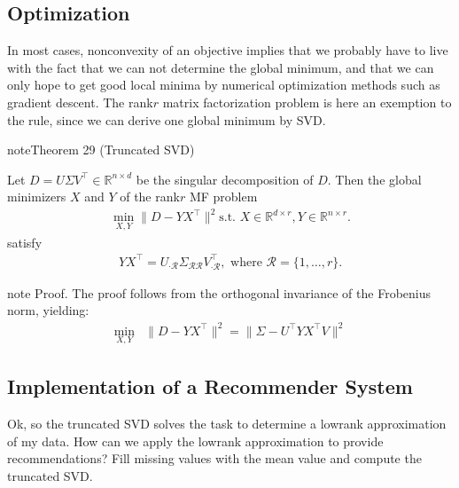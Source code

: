 \documentclass[letterpaper,10pt,english]{jupyterBook}
\begin{document}
\subsection{Optimization}
\label{\detokenize{dim_reduction_mf:optimization}}
\sphinxAtStartPar
In most cases, nonconvexity of an objective implies that we probably have to live with the fact that we can not determine the global minimum, and that we can only hope to get good local minima by numerical optimization methods such as gradient descent. The rank\sphinxhyphen{}\(r\) matrix factorization problem is here an exemption to the rule, since we can derive one global minimum by SVD.
\label{dim_reduction_mf:theorem-2}
\begin{sphinxadmonition}{note}{Theorem 29 (Truncated SVD)}



\sphinxAtStartPar
Let \(D=U\Sigma V^\top\in\mathbb{R}^{n\times d}\) be the singular decomposition of \(D\). Then the global minimizers \(X\) and \(Y\)  of the rank\sphinxhyphen{}\(r\) MF problem
\label{equation:dim_reduction_mf:244980d3-902c-4384-bda4-7a253cda7599}\begin{align}
\min_{X,Y}\lVert D-YX^\top\rVert^2 \text{s.t. } X\in \mathbb{R}^{d\times r}, Y\in\mathbb{R}^{n\times r}.
\end{align}
\sphinxAtStartPar
satisfy
\label{equation:dim_reduction_mf:b4cecb59-8e17-4cb9-942d-3e80bbd73796}\begin{align} 
YX^\top = U_{\cdot \mathcal{R}}\Sigma_{\mathcal{R}\mathcal{R}}V_{\cdot \mathcal{R}}^\top, \text{ where }\mathcal{R}=\{1,\ldots, r\}.
\end{align}\end{sphinxadmonition}

\begin{sphinxadmonition}{note}
\sphinxAtStartPar
Proof. The proof follows from
the orthogonal invariance of the Frobenius norm, yielding:
\begin{align*}
    \min_{X,Y}&\lVert D-YX^\top\rVert^2 = \lVert \Sigma - U^\top YX^\top V\rVert^2 
\end{align*}\end{sphinxadmonition}


\subsection{Implementation of a Recommender System}
\label{\detokenize{dim_reduction_mf:implementation-of-a-recommender-system}}
\sphinxAtStartPar
Ok, so the truncated SVD solves the task to determine a low\sphinxhyphen{}rank approximation of my data.
How can we apply the low\sphinxhyphen{}rank approximation to provide recommendations?
Fill missing values with the mean value and compute the truncated SVD.
\end{document}

